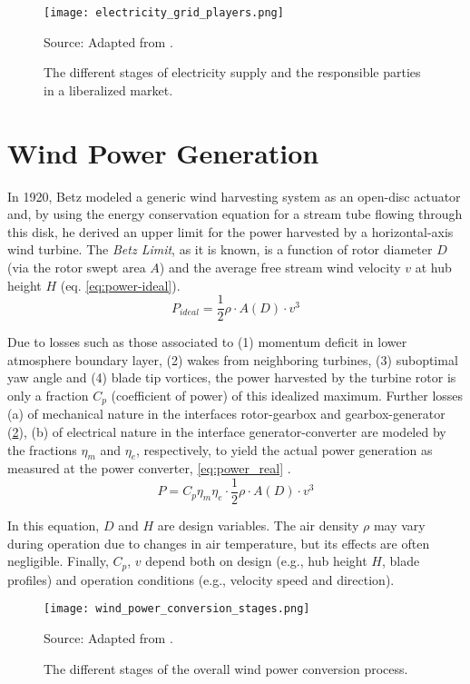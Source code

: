\begin{figure}[H]%
	\centering
    \caption{The different stages of electricity supply and the responsible parties in a liberalized market.}
    \texttt{[image: electricity\_grid\_players.png]} \\
    \raggedright
    Source: Adapted from \cite{erbach2016market}.
	\label{fig:electricity_grid_players}
\end{figure}

\section{Wind Power Generation}

In 1920, Betz \cite{betz1920limit} modeled a generic wind harvesting system as an open-disc actuator and, by using the energy conservation equation for a stream tube flowing through this disk, he derived an upper limit for the power harvested by a horizontal-axis wind turbine. The \textit{Betz Limit}, as it is known, is a function of rotor diameter $D$ (via the rotor swept area $A$) and the average free stream wind velocity $v$ at hub height $H$ (eq. \ref{eq:power-ideal}).
\begin{equation}\label{eq:power-ideal}
P_{ideal} = \frac{1}{2}\rho \cdot A(D)\cdot v^3
\end{equation}

Due to losses such as those associated to (1) momentum deficit in lower atmosphere boundary layer, (2) wakes from neighboring turbines, (3) suboptimal yaw angle and (4) blade tip vortices, the power harvested by the turbine rotor is only a fraction $C_p$ (coefficient of power) of this idealized maximum. Further  losses (a) of mechanical nature in the interfaces rotor-gearbox and gearbox-generator (\ref{fig:wind_power_conversion_stages}), (b) of electrical nature in the interface generator-converter  are modeled by the fractions $\eta_{m}$ and $\eta_{e}$, respectively,  to yield the actual power generation as measured at the power converter, \ref{eq:power_real} \cite{albadi2009capacity}.
\begin{equation}\label{eq:power_real}
P = C_p\eta_{m} \eta_{e}  \cdot \frac{1}{2}\rho \cdot A(D)\cdot v^3
\end{equation}

In this equation, $D$ and $H$ are design variables. The air density $\rho$ may vary during operation due to changes in air temperature, but its effects are often negligible. Finally, $C_p$, $v$ depend both on design (e.g., hub height $H$, blade profiles) and operation conditions (e.g., velocity speed and direction).
\begin{figure}[H] %
	\centering
    \caption{ The different stages of the overall wind power conversion process. }
    \texttt{[image: wind\_power\_conversion\_stages.png]} \\
    \raggedright
    Source: Adapted from \cite{molina2011modelling}.
	\label{fig:wind_power_conversion_stages}
\end{figure}


